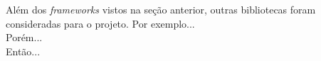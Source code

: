 Além dos \textit{frameworks} vistos na seção anterior, outras bibliotecas foram consideradas para o projeto. Por exemplo...\\
Porém...\\
Então...


